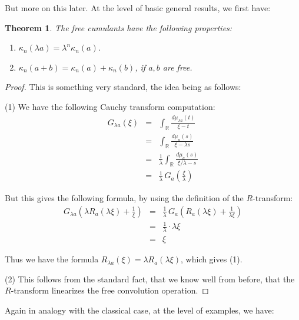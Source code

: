 \documentclass[12pt]{amsbook}
\newtheorem{theorem}{Theorem}[chapter]
\begin{document}
But more on this later. At the level of basic general results, we first have:

\begin{theorem}
The free cumulants have the following properties:
\begin{enumerate}
\item $\kappa_n(\lambda a)=\lambda^n\kappa_n(a)$.

\item $\kappa_n(a+b)=\kappa_n(a)+\kappa_n(b)$, if $a,b$ are free.
\end{enumerate}
\end{theorem}

\begin{proof}
This is something very standard, the idea being as follows:

\medskip

(1) We have the following Cauchy transform computation:
\begin{eqnarray*}
G_{\lambda a}(\xi)
&=&\int_\mathbb R\frac{d\mu_{\lambda a}(t)}{\xi-t}\\
&=&\int_\mathbb R\frac{d\mu_a(s)}{\xi-\lambda s}\\
&=&\frac{1}{\lambda}\int_\mathbb R\frac{d\mu_a(s)}{\xi/\lambda-s}\\
&=&\frac{1}{\lambda}\,G_a\left(\frac{\xi}{\lambda}\right)
\end{eqnarray*}

But this gives the following formula, by using the definition of the $R$-transform:
\begin{eqnarray*}
G_{\lambda a}\left(\lambda R_a(\lambda\xi)+\frac{1}{\xi}\right)
&=&\frac{1}{\lambda}\,G_a\left(R_a(\lambda\xi)+\frac{1}{\lambda\xi}\right)\\
&=&\frac{1}{\lambda}\cdot\lambda\xi\\
&=&\xi
\end{eqnarray*}

Thus we have the formula $R_{\lambda a}(\xi)=\lambda R_a(\lambda\xi)$, which gives (1). 

\medskip

(2) This follows from the standard fact, that we know well from before, that the $R$-transform linearizes the free convolution operation.
\end{proof}

Again in analogy with the classical case, at the level of examples, we have:
\end{document}
